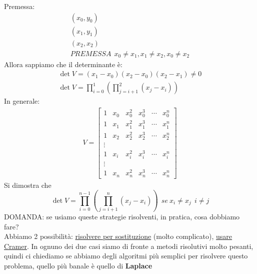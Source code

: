 \documentclass[a4paper, portrait]{book}
\numberwithin{equation}{chapter} %
\begin{document}
Premessa:
\begin{gather}
    (x_0,y_0)\\
    (x_1,y_1)\\
    (x_2,x_2)\\
    PREMESSA \ \ x_0 \neq x_1, x_1 \neq x_2, x_0 \neq x_2
\end{gather}
Allora sappiamo che il determinante è:
\begin{gather}
    \det V = (x_1 - x_0)(x_2 - x_0)(x_2-x_1)\neq 0\\
    \det V = \prod_{i=0}^{1}(\prod_{j = i + 1}^{2}(x_j - x_i))
\end{gather}
In generale:
\begin{gather}
    V = \begin{bmatrix}
        1&x_0&x_0^2&x_0^3&\cdots&x_0^n\\
        1&x_1&x_1^2&x_1^3&\cdots&x_1^n\\
        1&x_2&x_2^2&x_2^3&\cdots&x_2^n\\
        \vdots\\
        1&x_i&x_i^2&x_i^3&\cdots&x_i^n\\
        \vdots\\
        1&x_n&x_n^2&x_n^3&\cdots&x_n^n
    \end{bmatrix}
\end{gather}
Si dimostra che 
\begin{equation}
    \det V = \prod_{i=0}^{n-1}\left(\prod^n_{j = i +1}\left(x_j - x_i\right)\right) \ \ se \ x_i\neq x_j \ \ i \neq j
\end{equation}
DOMANDA: se usiamo queste strategie risolventi, in pratica, cosa dobbiamo fare?\\
Abbiamo 2 possibilità: \underline{risolvere per sostituzione} (molto complicato), \underline{usare Cramer}. In ognuno dei due casi siamo di fronte a metodi risolutivi molto pesanti, quindi ci chiediamo se abbiamo degli algoritmi più semplici per risolvere questo problema, quello più banale è quello di \textbf{Laplace}
\end{document}
